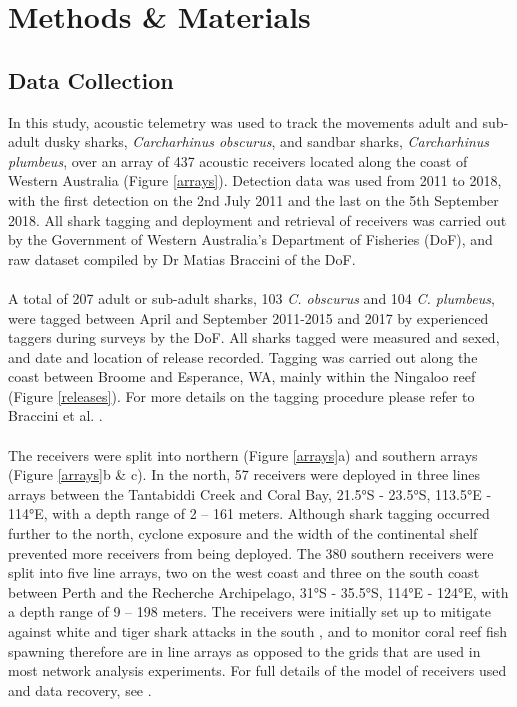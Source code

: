 \documentclass[11pt,a4paper]{article}
\begin{document}
	
	\newpage
	
	\section{Methods \& Materials}
	
	\subsection{Data Collection}
	
	In this study, acoustic telemetry was used to track the movements adult and sub-adult dusky sharks, \textit{Carcharhinus obscurus}, and sandbar sharks, \textit{Carcharhinus plumbeus}, over an array of 437 acoustic receivers located along the coast of Western Australia (Figure \ref{arrays}). Detection data was used from 2011 to 2018, with the first detection on the 2nd July 2011 and the last on the 5th September 2018. All shark tagging and deployment and retrieval of receivers was carried out by the Government of Western Australia’s Department of Fisheries (DoF), and raw dataset compiled by Dr Matias Braccini of the DoF.\\
	\\
	A total of 207 adult or sub-adult sharks, 103 \textit{C. obscurus} and 104 \textit{C. plumbeus}, were tagged between April and September 2011-2015 and 2017 by experienced taggers during surveys by the DoF. All sharks tagged were measured and sexed, and date and location of release recorded. Tagging was carried out along the coast between Broome and Esperance, WA, mainly within the Ningaloo reef (Figure \ref{releases}). For more details on the tagging procedure please refer to Braccini et al. \citeyear{Braccini2017c}.\\
	\\  
	The receivers were split into northern (Figure \ref{arrays}a) and southern arrays (Figure \ref{arrays}b \& c). In the north, 57 receivers were deployed in three lines arrays between the Tantabiddi Creek and Coral Bay, 21.5°S - 23.5°S, 113.5°E - 114°E, with a depth range of 2 – 161 meters. Although shark tagging occurred further to the north, cyclone exposure and the width of the continental shelf prevented more receivers from being deployed. The 380 southern receivers were split into five line arrays, two on the west coast and three on the south coast between Perth and the Recherche Archipelago, 31°S - 35.5°S, 114°E - 124°E, with a depth range of 9 – 198 meters. The receivers were initially set up to mitigate against white and tiger shark attacks in the south \citep{McAuley2016}, and to monitor coral reef fish spawning \citep{Babcock2017} therefore are in line arrays as opposed to the grids that are used in most network analysis experiments. For full details of the model of receivers used and data recovery, see \citealt{Braccini2017c,Braccini2017b}.\\
\end{document}
